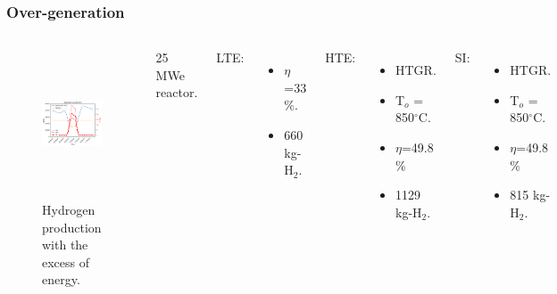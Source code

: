 \begin{frame}
\frametitle{Over-generation}
\begin{columns}
    \column[t]{5.5cm}
	\begin{figure}[htbp!]
		\begin{center}
			\includegraphics[height=4.4cm]{images/uiuc-hydro2B}
		\end{center}
		\caption{Hydrogen production with the excess of energy.}
	\end{figure}

    \column[t]{4.5cm}
    25 MWe reactor. \vspace{0.2cm}

    LTE:
    \begin{itemize}
 		\item $\eta$=33$\%$.
 		\item 660 kg-H$_2$.
 	\end{itemize}

    HTE:
    \begin{itemize}
 		\item HTGR.
 		\item T$_o$ = 850$^\circ$C.
 		\item $\eta$=49.8$\%$
 		\item 1129 kg-H$_2$.
 	\end{itemize}

    SI:
    \begin{itemize}
 		\item HTGR.
 		\item T$_o$ = 850$^\circ$C.
 		\item $\eta$=49.8$\%$
 		\item 815 kg-H$_2$.
 	\end{itemize}

\end{columns}
\end{frame}

